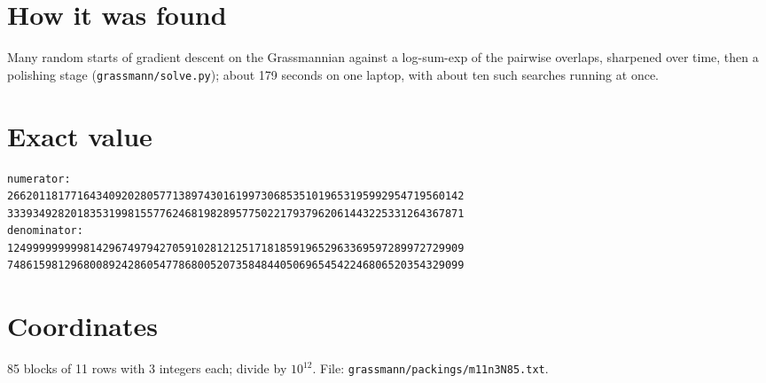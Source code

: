 \documentclass[11pt,a4paper]{article}
\begin{document}
\section{How it was found}
Many random starts of gradient descent on the Grassmannian against a log-sum-exp of the pairwise overlaps, sharpened over time, then a polishing stage (\texttt{grassmann/solve.py}); about 179 seconds on one laptop, with about ten such searches running at once.


\appendix
\section{Exact value}
{\small
\begin{verbatim}
numerator:
266201181771643409202805771389743016199730685351019653195992954719560142
333934928201835319981557762468198289577502217937962061443225331264367871
denominator:
124999999999814296749794270591028121251718185919652963369597289972729909
748615981296800892428605477868005207358484405069654542246806520354329099
\end{verbatim}}

\section{Coordinates}
85 blocks of 11 rows with 3 integers each; divide by $10^{12}$. File: \texttt{grassmann/packings/m11n3N85.txt}.
{\tiny
\begin{multicols}{3}
\end{multicols}}
\end{document}
